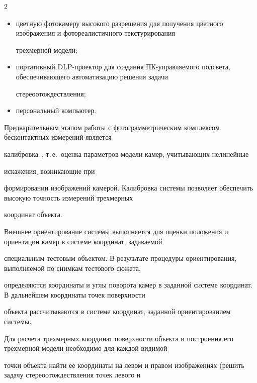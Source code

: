 \begin{multicols}{2}
\begin{itemize}
структурированном свете и расчета трехмерных координат поверхности лица;


\item цветную фотокамеру высокого разрешения для получения цветного изображения и фотореалистичного текстурирования 


трехмерной модели;


\item портативный DLP-проектор для создания ПК-управляемого подсвета, обеспечивающего автоматизацию решения задачи 


стереоотождествления;


\item персональный компьютер.


\end{itemize}





Предварительным этапом работы с фо\-то\-грам\-мет\-ри\-ческим комплексом бесконтактных измерений является 


калибровка~\cite{4kor, 5kor}, т.\,е.\ оценка па\-ра\-мет\-ров модели камер, учитывающих нелинейные\linebreak


 искажения, возникающие при 


формировании изоб\-ра\-же\-ний камерой. Калибровка системы поз\-во\-ля\-ет обеспечить высокую точность измерений трехмерных 


координат объекта.





Внешнее ориентирование системы выполняется для оценки положения и ориентации камер в системе координат, задаваемой 


специальным тестовым объектом. В результате процедуры ориентирования, выполняемой по снимкам тестового сюжета, 


определяются координаты и углы поворота камер в заданной системе координат. В дальнейшем координаты точек поверхности 


объекта рассчитываются в системе координат, заданной ориентированием системы.





Для расчета трехмерных координат поверхности объекта и построения его трехмерной модели необходимо для каждой видимой 


точки объекта найти ее координаты на левом и правом изображениях (решить задачу стереоотождествления точек левого и 



\end{multicols}
